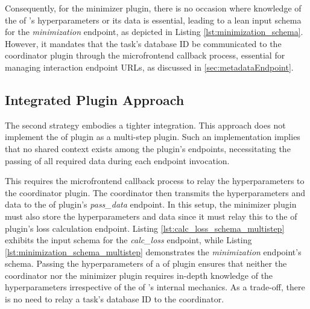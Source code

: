 \documentclass[
  a4paper,  %
  twoside,  %
  bibliography=totoc,
  headsepline,
  cleardoublepage=empty,
  parskip=half,
  draft=false
]{scrbook}
\begin{document}
Consequently, for the minimizer plugin, there is no occasion where knowledge of the \gls{of} 's hyperparameters or its data is essential, leading to a lean input schema for the \emph{minimization} endpoint, as depicted in Listing \ref{lst:minimization_schema}.
However, it mandates that the task's database ID be communicated to the coordinator plugin through the microfrontend callback process, essential for managing interaction endpoint URLs, as discussed in \ref{sec:metadataEndpoint}.



\subsection{Integrated Plugin Approach}
\label{sec:secondApproach}

The second strategy embodies a tighter integration.
This approach does not implement the \gls{of} plugin as a multi-step plugin.
Such an implementation implies that no shared context exists among the plugin's endpoints, necessitating the passing of all required data during each endpoint invocation.

This requires the microfrontend callback process to relay the hyperparameters to the coordinator plugin.
The coordinator then transmits the hyperparameters and data to the \gls{of} plugin's \emph{pass\_data} endpoint.
In this setup, the minimizer plugin must also store the hyperparameters and data since it must relay this to the \gls{of} plugin's loss calculation endpoint.
Listing \ref{lst:calc_loss_schema_multistep} exhibits the input schema for the \emph{calc\_loss} endpoint, while Listing \ref{lst:minimization_schema_multistep} demonstrates the \emph{minimization} endpoint's schema.
Passing the hyperparameters of a \gls{of} plugin ensures that neither the coordinator nor the minimizer plugin requires in-depth knowledge of the hyperparameters irrespective of the \gls{of} 's internal mechanics.
As a trade-off, there is no need to relay a task's database ID to the coordinator.



\end{document}
